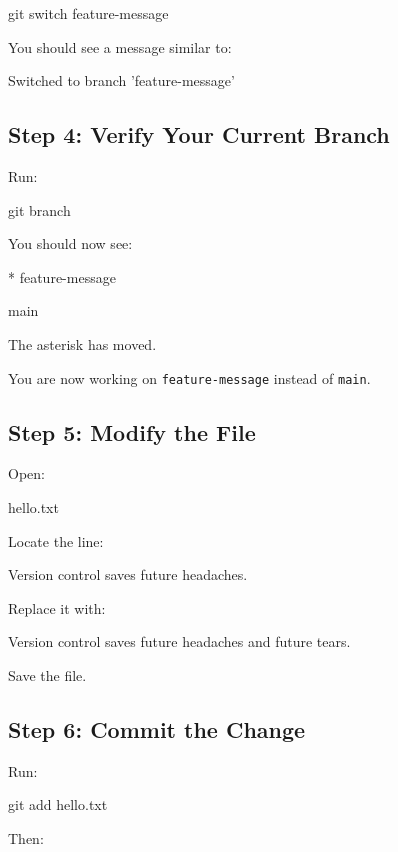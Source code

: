 \documentclass{csc2059practical}
\begin{document}
\begin{terminalplain}
git switch feature-message
\end{terminalplain}
You should see a message similar to:

\begin{terminalplain}
Switched to branch 'feature-message'
\end{terminalplain}
\subsection{Step 4: Verify Your Current Branch}
Run:

\begin{terminalplain}
git branch
\end{terminalplain}
You should now see:

\begin{terminalplain}
  
  * feature-message
  
  main

\end{terminalplain}

The asterisk has moved.

You are now working on \texttt{feature-message} instead of \texttt{main}.

\subsection{Step 5: Modify the File}
Open:

\begin{terminalplain}
hello.txt
\end{terminalplain}
Locate the line:

\begin{terminalplain}
Version control saves future headaches.
\end{terminalplain}
Replace it with:

\begin{terminalplain}
Version control saves future headaches and future tears.
\end{terminalplain}
Save the file.

\subsection{Step 6: Commit the Change}
Run:

\begin{terminalplain}
git add hello.txt
\end{terminalplain}
Then:
\end{document}

